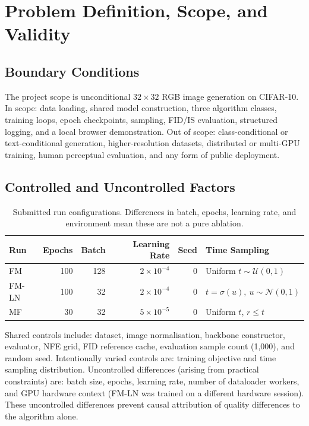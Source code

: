 ﻿\chapter{Problem Definition, Scope, and Validity}

\section{Boundary Conditions}

The project scope is unconditional $32\!\times\!32$ RGB image generation on
CIFAR-10. In scope: data loading, shared model construction, three algorithm
classes, training loops, epoch checkpoints, sampling, FID/IS evaluation,
structured logging, and a local browser demonstration. Out of scope:
class-conditional or text-conditional generation, higher-resolution datasets,
distributed or multi-GPU training, human perceptual evaluation, and any form of
public deployment.

\section{Controlled and Uncontrolled Factors}

\begin{table}[htbp]\centering
\caption{Submitted run configurations. Differences in batch, epochs, learning
  rate, and environment mean these are not a pure ablation.}\label{tab:config}
\begin{tabular}{lrrrrl}\toprule
Run & Epochs & Batch & Learning Rate & Seed & Time Sampling\\\midrule
FM                 & 100 & 128 & $2\!\times\!10^{-4}$ & 0 & Uniform $t\!\sim\!\mathcal{U}(0,1)$\\
FM-LN  & 100 &  32 & $2\!\times\!10^{-4}$ & 0 & $t=\sigma(u),\ u\!\sim\!\mathcal{N}(0,1)$\\
MF     &  30 &  32 & $5\!\times\!10^{-5}$ & 0 & Uniform $t$, $r\!\le\!t$\\\bottomrule
\end{tabular}\end{table}

Shared controls include: dataset, image normalisation, backbone constructor,
evaluator, NFE grid, FID reference cache, evaluation sample count (1{,}000),
and random seed. Intentionally varied controls are: training objective and time
sampling distribution. Uncontrolled differences (arising from practical
constraints) are: batch size, epochs, learning rate, number of dataloader
workers, and GPU hardware context (FM-LN was trained on a different hardware
session). These uncontrolled differences prevent causal attribution of quality
differences to the algorithm alone.

